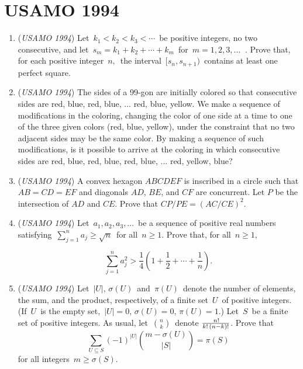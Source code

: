 \section{USAMO 1994}
        \begin{enumerate}
        	\item (\textit{USAMO 1994}) Let $\, k_1 < k_2 < k_3 < \cdots \,$ be positive integers, no two consecutive, and let $\, s_m = k_1 + k_2 + \cdots + k_m \,$ for $\, m = 1,2,3, \ldots \; \;$.  Prove that, for each positive integer $\, n, \,$ the interval $\, [s_n, s_{n + 1}) \,$ contains at least one perfect square.


 

	\item (\textit{USAMO 1994}) The sides of a 99-gon are initially colored so that consecutive sides are red, blue, red, blue, ...  red, blue, yellow. We make a sequence of modifications in the coloring, changing the color of one side at a time to one of the three given colors (red, blue, yellow), under the constraint that no two adjacent sides may be the same color. By making a sequence of such modifications, is it possible to arrive at the coloring in which consecutive sides 
are red, blue, red, blue, red, blue, ...  red, yellow, blue?


 

	\item (\textit{USAMO 1994}) A convex hexagon $ABCDEF$ is inscribed in a circle such that $AB = CD = EF$ and diagonals $AD$, $BE$, and $CF$ are concurrent. Let $P$ be the intersection of $AD$ and $CE$. Prove that $CP/PE = (AC/CE)^2$.


 

	\item (\textit{USAMO 1994}) Let $\, a_1, a_2, a_3, \ldots \,$ be a sequence of positive real numbers satisfying $\, \sum_{j = 1}^n a_j \geq \sqrt {n} \,$ for all $\, n \geq 1$. Prove that, for all $\, n \geq 1, \,$

 \[\sum_{j = 1}^n a_j^2 > \frac {1}{4} \left( 1 + \frac {1}{2} + \cdots + \frac {1}{n} \right).\]


	\item (\textit{USAMO 1994}) Let $\, |U|, \, \sigma(U) \,$ and $\, \pi(U) \,$ denote the number of elements, the sum, and the product, respectively, of a finite set $\, U \,$ of positive integers.  (If $\, U \,$ is the empty set, $\, |U| = 0, \, \sigma(U) = 0, \, \pi(U) = 1$.) Let $\, S \,$ be a finite set of positive integers. As usual, let $\, \binom{n}{k} \,$ denote $\, n! \over k! \, (n-k)!$. Prove that 
 \[\sum_{U \subseteq S} (-1)^{|U|} \binom{m - \sigma(U)}{|S|} = \pi(S)\] for all integers $\, m \geq \sigma(S)$.


 

\end{enumerate}